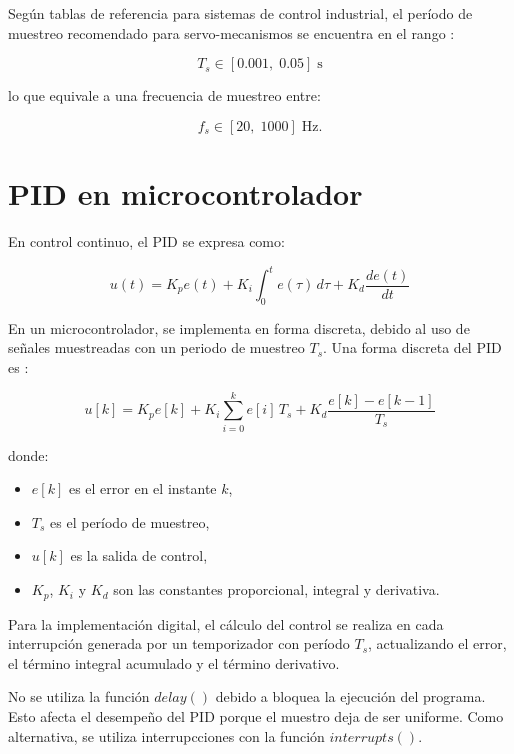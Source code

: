 \documentclass[letter,12pt]{article}
\begin{document}
Según tablas de referencia para sistemas de control industrial, el período de muestreo recomendado para servo-mecanismos se encuentra en el rango \cite{LandauDigitalControl}:

\begin{equation*}
	T_s \in [0.001,\;0.05] \;\text{s}
\end{equation*}

lo que equivale a una frecuencia de muestreo entre:

\begin{equation*}
	f_s \in [20,\;1000] \;\text{Hz}.
\end{equation*}

\section{PID en microcontrolador}

En control continuo, el PID se expresa como:

\begin{equation}
	u(t) = K_p e(t) + K_i \int_{0}^{t} e(\tau)\, d\tau + K_d \frac{de(t)}{dt}
	\label{eq:pid_continuo}
\end{equation}

En un microcontrolador, se implementa en forma discreta, debido al uso de señales muestreadas con un periodo de muestreo $T_s$. Una forma discreta del PID es \cite{OchoaPIDDigital}:

\begin{equation}
	u[k] = K_p e[k] 
	+ K_i \sum_{i=0}^{k} e[i]\,T_s 
	+ K_d \frac{e[k] - e[k-1]}{T_s}
	\label{eq:pid_discreto}
\end{equation}

donde:
\begin{itemize}
	\item $e[k]$ es el error en el instante $k$,
	\item $T_s$ es el período de muestreo,
	\item $u[k]$ es la salida de control,
	\item $K_p$, $K_i$ y $K_d$ son las constantes proporcional, integral y derivativa.
\end{itemize}

Para la implementación digital, el cálculo del control se realiza en cada interrupción generada por un temporizador con período $T_s$, actualizando el error, el término integral acumulado y el término derivativo.

No se utiliza la función $delay()$ debido a bloquea la ejecución del programa. \cite{ArduinoDelay} Esto afecta el desempeño del PID porque el muestro deja de ser uniforme. Como alternativa, se utiliza interrupcciones con la función $interrupts()$.
\end{document}
